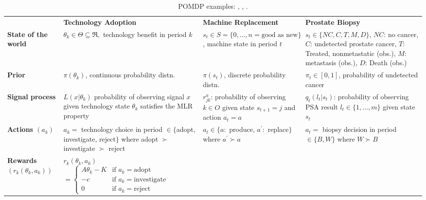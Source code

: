 \begin{landscape}
\begin{table}[h!]
\footnotesize
\centering
\caption{POMDP examples: \citet{ulu2009uncertainty},
\citet{white1979optimal}, \citet{zhang2012optimization}.}
\label{tab:pomdp-examples}
\renewcommand{\arraystretch}{1.4}
\begin{tabular}{>{\bfseries}p{2.5cm} p{6.5cm} p{6.5cm} p{5.5cm}}
\toprule
 & \textbf{Technology Adoption} & \textbf{Machine Replacement} & \textbf{Prostate Biopsy} \\
State of the world
    & $\theta_k \in \Theta \subseteq \Re, $ \newline technology benefit in period $k$
    & $s_t \in S=\{0,\ldots,n=\text{good as new}\}$, \newline machine state in period $t$
    & $s_t\in \{NC, C, T, M, D\}$, $NC$: no cancer, $C$: undetected prostate cancer,
    $T$: Treated, nonmetastatic (obs.), \newline $M$: metastasis (obs.), $D$: Death (obs.)\\
\midrule
Prior
  &$\pi(\theta_k)$, \newline continuous probability distn.
  & $\pi(s_t)$, \newline discrete probability distn.
  & $\pi_t \in [0,1]$, \newline probability of undetected cancer \\
\midrule
Signal process
    & $L(x|\theta_k)$ probability of observing signal $x$ given technology state $\theta_k$ \newline
    satisfies the MLR property
    &$r_{jk}^a$: probability of observing $k\in O$ given state $s_{t+1}=j$ and action $a_t=a$
  & $q_t(l_t|s_t)$: probability of observing PSA result $l_t \in \{1,\ldots,m\}$
    given state $s_t$ \\
\midrule
Actions $(a_k)$
  & $a_k = $ technology choice in period\newline
    $\in \{$adopt, investigate, reject$\}$\newline
    where adopt $\succ$ investigate $\succ$ reject
  & $a_t \in \{a:$ produce, $a^\prime:$ replace$\}$\newline
  where  $a^\prime\succ a$
  & $a_t = $ biopsy decision in period  $\in \{B, W\}$\newline
   where $W\succ B$\\
\midrule
Rewards\newline$(r_k(\theta_k, a_k))$
  & $r_k(\theta_k, a_k)$\newline
    $= \begin{cases} A\theta_k - K & \text{if } a_k = \text{adopt} \\ -c & \text{if } a_k = \text{investigate} \\ 0 & \text{if } a_k = \text{reject} \end{cases}$

\end{tabular}
\end{table}
\end{landscape}
